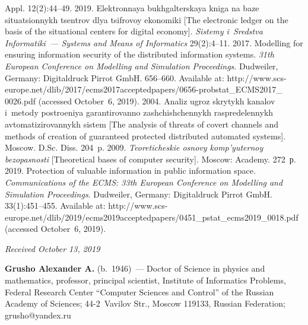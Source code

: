 \begin{multicols}{2}
{{\begin{thebibliography}{99}
{Appl.} 12(2):44--49.
 2019. Elektronnaya bukhgalterskaya 
kniga na baze situatsionnykh tsentrov dlya tsifrovoy ekonomiki [The electronic ledger on the basis of 
the situational centers for digital economy]. \textit{Sistemy i~Sredstva Informatiki~--- Systems and 
Means of Informatics} 29(2):4--11.
 2017. Modelling for ensuring 
information security of the distributed information systems. \textit{31th European Conference on 
Modelling and Simulation Proceedings}. Dudweiler, Germany: Digitaldruck Pirrot GmbH. 656--660. 
Available at: {\sf  
http://www.scs-europe.net/dlib/2017/\linebreak ecms2017acceptedpapers/0656-probstat\_ECMS2017\_ 0026.pdf} (accessed 
October~6, 2019).
 2004. Analiz ugroz skrytykh kanalov i~metody postroeniya garantirovanno 
zashchishchennykh raspredelennykh avtomatizirovannykh sistem [The analysis of threats of covert 
channels and methods of creation of guaranteed protected distributed automated 
systems]. Moscow.  D.Sc. Diss.  204~p.
 2009. \textit{Teoreticheskie osnovy 
komp'yuternoy bezopasnosti} [Theoretical bases of computer security]. Moscow: Academy. 272~р.
 2019. Protection of 
valuable information in public information space. \textit{Communications of the ECMS:  33th 
European Conference on Modelling and Simulation Proceedings}. 
Dudweiler, Germany: Digitaldruck Pirrot GmbH.
33(1):451--455. Available at: {\sf 
http://www.scs-europe.net/dlib/2019/ecms2019acceptedpapers/0451\_\linebreak pstat\_ecms2019\_0018.pdf} (accessed 
October~6, 2019).
\end{thebibliography}

 }
 }

\end{multicols}

\vspace*{-6pt}

\hfill{\small\textit{Received October 13, 2019}}




\Contr


\noindent
\textbf{Grusho Alexander A.} (b.\ 1946)~--- Doctor of Science in physics and 
mathematics, professor, principal scientist, Institute of Informatics Problems, Federal 
Research Center ``Computer Sciences and Control'' of the Russian Academy of 
Sciences; 44-2~Vavilov Str., Moscow 119133, Russian Federation;  
\mbox{grusho@yandex.ru}

